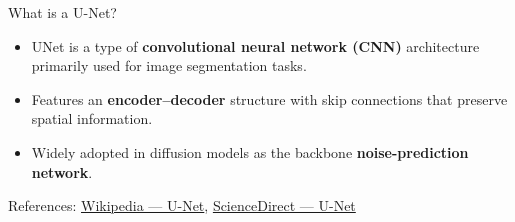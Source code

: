\documentclass[aspectratio=169,10pt]{beamer}
\begin{document}
\begin{frame}{What is a U-Net?}
  \begin{itemize}
    \item UNet is a type of \textbf{convolutional neural network (CNN)}
          architecture primarily used for image segmentation tasks.
    \item Features an \textbf{encoder–decoder} structure with skip
          connections that preserve spatial information.
    \item Widely adopted in diffusion models as the backbone
          \textbf{noise-prediction network}.
  \end{itemize}
  \vspace{4pt}
  References:
  \href{https://en.wikipedia.org/wiki/U-Net}{Wikipedia — U-Net},
  \href{https://www.sciencedirect.com/topics/computer-science/u-net}{ScienceDirect — U-Net}
\end{frame}
\end{document}
